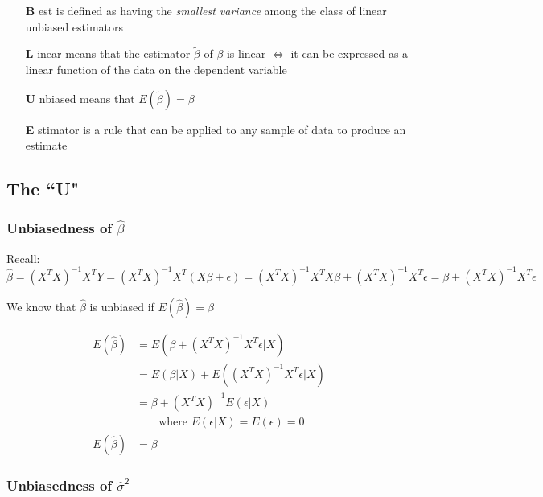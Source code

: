 \documentclass[12pt]{article}
\begin{document}
\begin{itemize}
\item[\textbf{B}] est is defined as having the \emph{smallest variance} among the class of linear unbiased estimators
\item[\textbf{L}] inear means that the estimator $\tilde{\beta}$ of $\beta$ is linear $\iff$ it can be expressed as a linear function of the data on the dependent variable
\item[\textbf{U}] nbiased means that $E (\tilde{\beta}) = \beta$
\item[\textbf{E}] stimator is a rule that can be applied to any sample of data to produce an estimate
\end{itemize}

\subsection{The ``U"}
\subsubsection{Unbiasedness of $\hat{\beta}$}
Recall:
\[ \hat{\beta} = (X^{T}X)^{-1}X^{T}Y = (X^{T}X)^{-1}X^{T}(X\beta + \epsilon) = (X^{T}X)^{-1}X^{T}X\beta + (X^{T}X)^{-1}X^{T}\epsilon  = \beta + (X^{T}X)^{-1}X^{T}\epsilon \]

We know that $\hat{\beta}$ is unbiased if $E (\hat{\beta}) = \beta$

\doublespacing
\[ \begin{array}{rl}
E (\hat{\beta}) &= E(\beta + (X^{T}X)^{-1}X^{T}\epsilon | X) \\
 &= E(\beta | X) + E((X^{T}X)^{-1}X^{T}\epsilon | X) \\
 &= \beta + (X^{T}X)^{-1} E(\epsilon | X) \\
 &\qquad \text{where } E(\epsilon | X) = E(\epsilon) = 0 \\
E (\hat{\beta}) &= \beta 
\end{array} \]
\singlespacing


\subsubsection{Unbiasedness of $\hat{\sigma}^2$}
\end{document}
